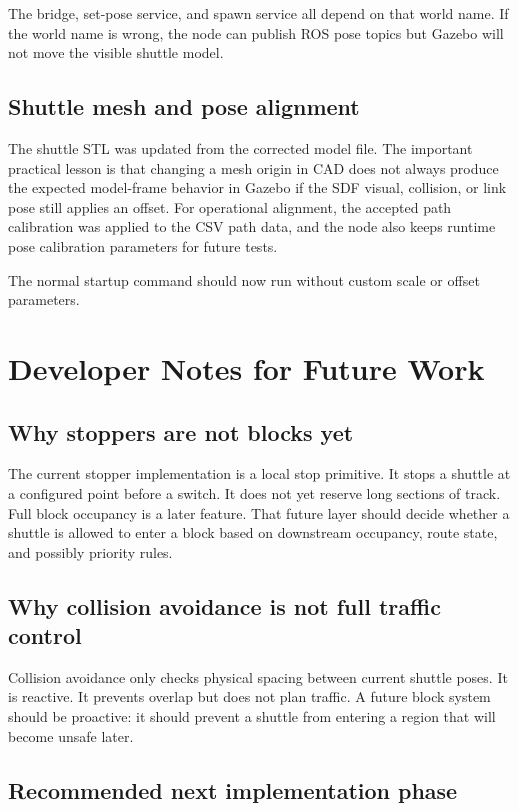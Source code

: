 \documentclass[12pt,a4paper]{report}
\begin{document}
The bridge, set-pose service, and spawn service all depend on that world name.
If the world name is wrong, the node can publish ROS pose topics but Gazebo will
not move the visible shuttle model.

\section{Shuttle mesh and pose alignment}

The shuttle STL was updated from the corrected model file. The important
practical lesson is that changing a mesh origin in CAD does not always produce
the expected model-frame behavior in Gazebo if the SDF visual, collision, or
link pose still applies an offset. For operational alignment, the accepted path
calibration was applied to the CSV path data, and the node also keeps runtime
pose calibration parameters for future tests.

The normal startup command should now run without custom scale or offset
parameters.

\chapter{Developer Notes for Future Work}

\section{Why stoppers are not blocks yet}

The current stopper implementation is a local stop primitive. It stops a
shuttle at a configured point before a switch. It does not yet reserve long
sections of track. Full block occupancy is a later feature. That future layer
should decide whether a shuttle is allowed to enter a block based on downstream
occupancy, route state, and possibly priority rules.

\section{Why collision avoidance is not full traffic control}

Collision avoidance only checks physical spacing between current shuttle poses.
It is reactive. It prevents overlap but does not plan traffic. A future block
system should be proactive: it should prevent a shuttle from entering a region
that will become unsafe later.

\section{Recommended next implementation phase}
\end{document}
